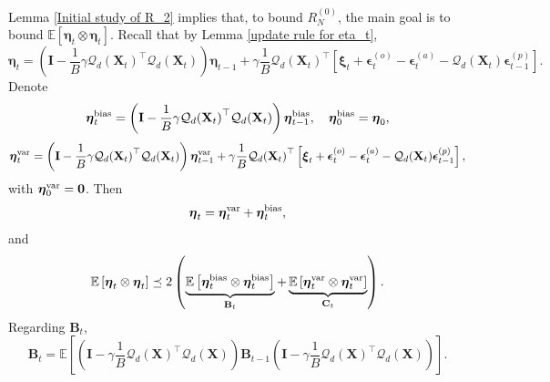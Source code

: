 \documentclass[11pt, letterpaper]{article}
\begin{document}
Lemma \ref{Initial study of R_2} implies that, to bound $R_N^{(0)}$, the main goal is to bound $\mathbb{E}[\boldsymbol{\eta}_t\otimes\boldsymbol{\eta}_t]$. Recall that by Lemma \ref{update rule for eta_t},
    \begin{equation*}
        \boldsymbol{\eta}_t = \left(\mathbf{I}-\frac{1}{B}\gamma {\mathcal{Q}_d(\mathbf{X}_t)}^\top \mathcal{Q}_d(\mathbf{X}_t) \right)\boldsymbol{\eta}_{t-1}+\gamma\frac{1}{B}{\mathcal{Q}_d(\mathbf{X}_t)}^\top \left[\boldsymbol{\xi}_t+\boldsymbol{\epsilon}_t^{(o)}-\boldsymbol{\epsilon}_t^{(a)}-\mathcal{Q}_d(\mathbf{X}_t)\boldsymbol{\epsilon}_{t-1}^{(p)}\right].
    \end{equation*}
Denote
\begin{equation*}
    \boldsymbol{\eta}_t^{\rm bias}=\left(\mathbf{I}-\frac{1}{B}\gamma {\mathcal{Q}_d(\mathbf{X}_t)}^\top \mathcal{Q}_d(\mathbf{X}_t) \right)\boldsymbol{\eta}_{t-1}^{\rm bias},\quad \boldsymbol{\eta}_{0}^{\rm bias}=\boldsymbol{\eta}_0,
\end{equation*}
\begin{equation*}
    \boldsymbol{\eta}_t^{\rm var}=\left(\mathbf{I}-\frac{1}{B}\gamma {\mathcal{Q}_d(\mathbf{X}_t)}^\top \mathcal{Q}_d(\mathbf{X}_t) \right)\boldsymbol{\eta}_{t-1}^{\rm var}+\gamma\frac{1}{B}{\mathcal{Q}_d(\mathbf{X}_t)}^\top \left[\boldsymbol{\xi}_t+\boldsymbol{\epsilon}_t^{(o)}-\boldsymbol{\epsilon}_t^{(a)}-\mathcal{Q}_d(\mathbf{X}_t)\boldsymbol{\epsilon}_{t-1}^{(p)}\right],
\end{equation*}
with $\boldsymbol{\eta}_0^{\rm var}=\boldsymbol{0}$. Then 
\begin{equation*}
    \boldsymbol{\eta}_t=\boldsymbol{\eta}_t^{\rm var}+\boldsymbol{\eta}_t^{\rm bias},
\end{equation*}
and
\begin{equation}
    \mathbb{E}\left[\boldsymbol{\eta}_t\otimes\boldsymbol{\eta}_t\right] \preceq 2\left(\underbrace{\mathbb{E}\left[\boldsymbol{\eta}_t^{\rm bias}\otimes\boldsymbol{\eta}_t^{\rm bias}\right]}_{\mathbf{B}_t}+\underbrace{\mathbb{E}\left[\boldsymbol{\eta}_t^{\rm var}\otimes\boldsymbol{\eta}_t^{\rm var}\right]}_{\mathbf{C}_t}\right).
\end{equation}
Regarding $\mathbf{B}_t$,
\begin{equation}
    \label{eq: bt}
    \mathbf{B}_t=\mathbb{E}\left[\left(\mathbf{I}-\gamma\frac{1}{B} {\mathcal{Q}_d(\mathbf{X})}^\top \mathcal{Q}_d(\mathbf{X}) \right)\mathbf{B}_{t-1}\left(\mathbf{I}-\gamma\frac{1}{B} {\mathcal{Q}_d(\mathbf{X})}^\top \mathcal{Q}_d(\mathbf{X}) \right)\right].
\end{equation}
\end{document}
